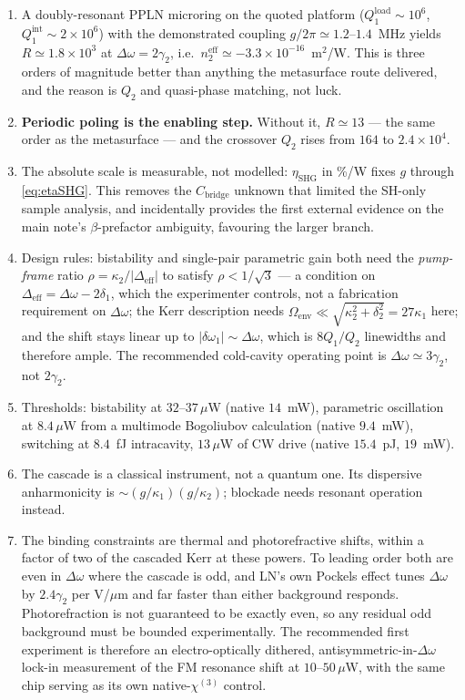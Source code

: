 \documentclass[11pt,a4paper]{article}
\newcommand{\chithree}{\chi^{(3)}}
\newcommand{\Dom}{\Delta\omega}
\newcommand{\etanorm}{\eta_{\text{SHG}}}
\begin{document}
\begin{enumerate}[leftmargin=1.8em,itemsep=3pt]
\item A doubly-resonant PPLN microring on the quoted platform
  ($Q_1^{\text{load}}\sim10^6$, $Q_1^{\text{int}}\sim2\times10^6$) with
  the demonstrated coupling $g/2\pi\simeq1.2$--$1.4$~MHz yields
  $R\simeq1.8\times10^3$ at $\Dom=2\gamma_2$, i.e.\
  $n_2^{\text{eff}}\simeq-3.3\times10^{-16}$~m$^2$/W.  This is three
  orders of magnitude better than anything the metasurface route
  delivered, and the reason is $Q_2$ and quasi-phase matching, not luck.
\item \textbf{Periodic poling is the enabling step.}  Without it,
  $R\simeq13$ --- the same order as the metasurface --- and the
  crossover $Q_2$ rises from $164$ to $2.4\times10^4$.
\item The absolute scale is measurable, not modelled: $\etanorm$ in
  \%/W fixes $g$ through \eqref{eq:etaSHG}.  This removes the
  $C_{\text{bridge}}$ unknown that limited the SH-only sample analysis,
  and incidentally provides the first external evidence on the main
  note's $\beta$-prefactor ambiguity, favouring the larger branch.
\item Design rules: bistability and single-pair parametric gain both
  need the \emph{pump-frame} ratio $\rho=\kappa_2/|\Delta_{\text{eff}}|$
  to satisfy $\rho<1/\sqrt3$ --- a condition on $\Delta_{\text{eff}}=\Dom-2\delta_1$,
  which the experimenter controls, not a fabrication requirement on
  $\Dom$; the Kerr description needs
  $\Omega_{\text{env}}\ll\sqrt{\kappa_2^2+\delta_2^2}=27\kappa_1$ here;
  and the shift stays linear up to $|\delta\omega_1|\sim\Dom$, which is
  $8Q_1/Q_2$ linewidths and therefore ample.  The recommended cold-cavity
  operating point is $\Dom\simeq3\gamma_2$, not $2\gamma_2$.
\item Thresholds: bistability at $32$--$37\,\mu$W (native $14$~mW),
  parametric oscillation at $8.4\,\mu$W from a multimode Bogoliubov
  calculation (native $9.4$~mW), switching at $8.4$~fJ intracavity,
  $13\,\mu$W of CW drive (native $15.4$~pJ, $19$~mW).
\item The cascade is a classical instrument, not a quantum one.  Its
  dispersive anharmonicity is $\sim(g/\kappa_1)(g/\kappa_2)$; blockade
  needs resonant operation instead.
\item The binding constraints are thermal and photorefractive shifts,
  within a factor of two of the cascaded Kerr at these powers.  To
  leading order both are even in $\Dom$ where the cascade is odd, and
  LN's own Pockels effect tunes $\Dom$ by $2.4\gamma_2$ per V/$\mu$m and
  far faster than either background responds.  Photorefraction is not
  guaranteed to be exactly even, so any residual odd background must be
  bounded experimentally.  The recommended first experiment is therefore an
  electro-optically dithered, antisymmetric-in-$\Dom$ lock-in
  measurement of the FM resonance shift at $10$--$50\,\mu$W, with the
  same chip serving as its own native-$\chithree$ control.
\end{enumerate}
\end{document}
